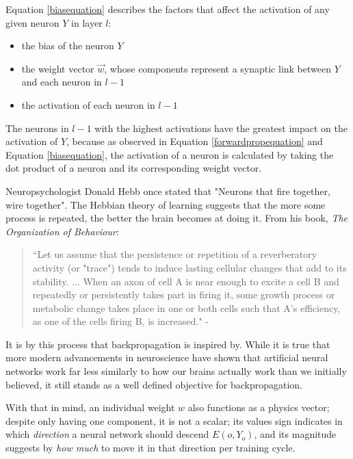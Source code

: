 \documentclass[12pt]{article}
\begin{document}
Equation \ref{biasequation} describes the factors that affect the activation of any given neuron $Y$ in layer $l$:

\begin{itemize}
  \item the bias of the neuron $Y$
  \item the weight vector $\vec{w}$, whose components represent a synaptic link between $Y$ and each neuron in $l - 1$
  \item the activation of each neuron in $l - 1$
\end{itemize}

The neurons in $l - 1$ with the highest activations have the greatest impact on the activation of $Y$, because as observed in Equation \ref{forwardpropequation} and Equation \ref{biasequation}, the activation of a neuron is calculated by taking the dot product of a neuron and its corresponding weight vector.

Neuropsychologist Donald Hebb once stated that "Neurons that fire together, wire together". The Hebbian theory of learning suggests that the more some process is repeated, the better the brain becomes at doing it. From his book, \textit{The Organization of Behaviour}:

\begin{quote}
  ``Let us assume that the persistence or repetition of a reverberatory activity (or "trace") tends to induce lasting cellular changes that add to its stability. ... When an axon of cell A is near enough to excite a cell B and repeatedly or persistently takes part in firing it, some growth process or metabolic change takes place in one or both cells such that A's efficiency, as one of the cells firing B, is increased." - \textcite{Hebb1949}
\end{quote}

It is by this process that backpropagation is inspired by. While it is true that more modern advancements in neuroscience have shown that artificial neural networks work far less similarly to how our brains actually work than we initially believed, it still stands as a well defined objective for backpropagation.

With that in mind, an individual weight $w$ also functions as a physics vector; despite only having one component, it is not a scalar; its values sign indicates in which \textit{direction} a neural network should descend $E(o, Y_o)$, and its magnitude suggests by \textit{how much} to move it in that direction per training cycle.
\end{document}
